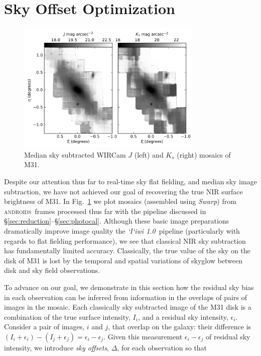 \documentclass[iop]{emulateapj}
\newcommand{\sw}[1]{\textit{#1}} %
\newcommand{\iiwione}{\sw{`I`iwi 1.0}}
\newcommand{\androids}{\textsc{androids}}
\newcommand{\Fig}[1]{Fig.~\ref{fig:#1}}  %
\newcommand{\Sec}[1]{\S\ref{sec:#1}}  %
\begin{document}
\section{Sky Offset Optimization}
\label{sec:scalar}

\begin{figure}[t]
\centering
\includegraphics[width=3.5in]{figs/raw_mosaics}
\caption{Median sky subtracted WIRCam $J$ (left) and $K_s$ (right) mosaics of M31.}
\label{fig:raw_mosaics}
\end{figure}

Despite our attention thus far to real-time sky flat fielding, and median sky image subtraction, we have not achieved our goal of recovering the true NIR surface brightness of M31.
In \Fig{raw_mosaics} we plot mosaics (assembled using \sw{Swarp}) from \androids\ frames processed thus far with the pipeline discussed in \Sec{reduction}--\Sec{photocal}.
Although these basic image preparations dramatically improve image quality the \iiwione\ pipeline (particularly with regards to flat fielding performance), we see that classical NIR sky subtraction has fundamentally limited accuracy.
Classically, the true value of the sky on the disk of M31 is lost by the temporal and spatial variations of skyglow between disk and sky field observations.

To advance on our goal, we demonstrate in this section how the residual sky bias in each observation can be inferred from information in the overlaps of pairs of images in the mosaic.
Each classically sky subtracted image of the M31 disk is a combination of the true surface intensity, $I_i$, and a residual sky intensity, $\epsilon_i$.
Consider a pair of images, $i$ and $j$, that overlap on the galaxy: their difference is $(I_i+\epsilon_i) - (I_j+\epsilon_j) = \epsilon_i - \epsilon_j$.
Given this measurement $\epsilon_i - \epsilon_j$ of residual sky intensity, we introduce \emph{sky offsets}, $\Delta$, for each observation so that
\end{document}
